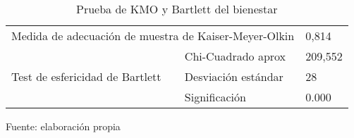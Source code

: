 \begin{table}[h]
    \caption {Prueba de KMO y Bartlett del bienestar}
	\label{tab:kmoB}
	\setlength\extrarowheight{5pt}
	
	\begin{tabular}{p{5.7cm} p{4.6cm} p{2.8cm}}
	\toprule
	\multicolumn{2}{c}{Medida de adecuación de muestra de Kaiser-Meyer-Olkin}	& 0,814 \\
									& Chi-Cuadrado aprox	& 209,552 \\
	Test de esfericidad de Bartlett	& Desviación estándar					& 28 \\
									& Significación					& 0.000 \\
	\bottomrule
	\end{tabular}
	
	\center
	\footnotesize
	Fuente: elaboración propia
\end{table}
